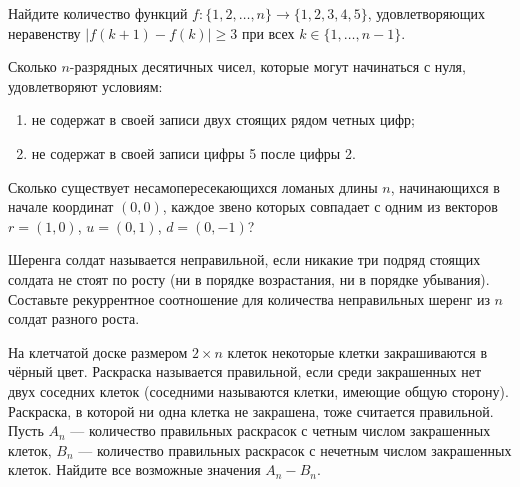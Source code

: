 \documentclass{article}
\begin{document}
\begin{enumerate_boxed}
        \item Найдите количество функций $f : \{1, 2, \ldots , n\} \to \{1, 2, 3, 4, 5\}$, удовлетворяющих неравенству $|f(k + 1) - f(k)| \geq 3$ при всех $k \in \{1, \ldots , n - 1\}$.

        \item Сколько $n$-разрядных десятичных чисел, которые могут начинаться с нуля, удовлетворяют условиям:
        \begin{enumerate}
            \item не содержат в своей записи двух стоящих рядом четных цифр;
            \item не содержат в своей записи цифры 5 после цифры 2.
        \end{enumerate}

        \item Сколько существует несамопересекающихся ломаных длины $n$, начинающихся в начале координат $(0, 0)$, каждое звено которых совпадает с одним из векторов $r = (1,0)$, $u = (0,1)$, $d = (0,-1)$?

        \item Шеренга солдат называется неправильной, если никакие три подряд стоящих солдата не стоят по росту (ни в порядке возрастания, ни в порядке убывания).
        Составьте рекуррентное соотношение для количества неправильных шеренг из $n$ солдат разного роста.

        \item На клетчатой доске размером $2 \times n$ клеток некоторые клетки закрашиваются в чёрный цвет.
        Раскраска называется правильной, если среди закрашенных нет двух соседних клеток (соседними называются клетки, имеющие общую сторону).
        Раскраска, в которой ни одна клетка не закрашена, тоже считается правильной.
        Пусть $A_n$ — количество правильных раскрасок с четным числом закрашенных клеток, $B_n$ — количество правильных раскрасок с нечетным числом закрашенных клеток.
        Найдите все возможные значения $A_n - B_n$.

    \end{enumerate_boxed}
\end{document}
